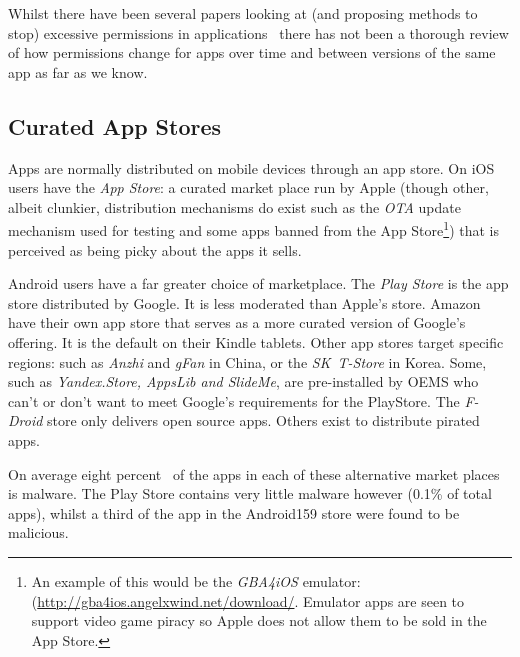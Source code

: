 \documentclass[a4paper,sfsidenotes]{%
  scrartcl%
}
\begin{document}
Whilst there have been several papers looking at (and proposing methods to stop)
excessive permissions in applications~\cite{Felt:2011kj,Vidas:2011wr} there
has not been a thorough review of how permissions change for apps over time
and between versions of the same app as far as we know. 



\subsection{Curated App Stores}

Apps are normally distributed on mobile devices through an app
store.  On iOS users have the \emph{App Store}: a curated market place run by
Apple (though other, albeit clunkier, distribution mechanisms do exist such as
the \emph{\ac{OTA}} update mechanism used for testing and some apps banned from
the App Store\footnote{An example of this would be the \emph{GBA4iOS} emulator:
(\url{http://gba4ios.angelxwind.net/download/}.  Emulator apps are seen to
support video game piracy so Apple does not allow them to be sold in the App
Store.}) that is perceived as being picky about the apps it sells.

Android users have a far greater choice of marketplace.  The \emph{Play Store}
is the app store distributed by Google. It is less moderated than Apple's store.
Amazon have their own app store that serves as a more curated version of
Google's offering. It is the default on their Kindle tablets.  Other app stores
target specific regions: such as \emph{Anzhi} and \emph{gFan} in China, or the \emph{SK~T-Store}
in Korea.  Some, such as \emph{Yandex.Store, AppsLib and SlideMe}, are
pre-installed by OEMS who can't or don't want to meet Google's requirements for
the PlayStore.  The \emph{F-Droid} store only delivers open source apps. Others
exist to distribute pirated apps. 

On average eight percent~\cite{AQUILINO:2013wr} of the apps in each of these
alternative market places is malware. The Play Store contains very little
malware however (0.1\% of total apps), whilst a third of the app in the
Android159 store were found to be malicious.
\end{document}
